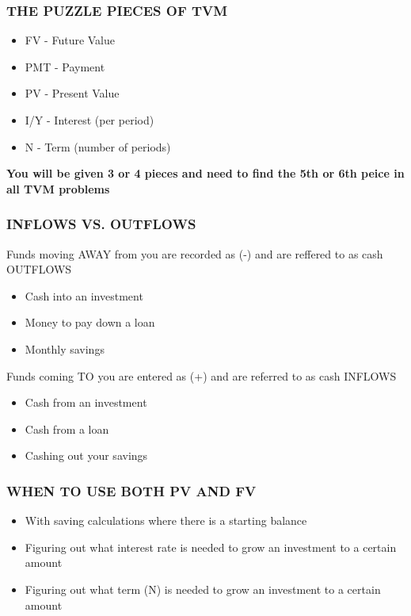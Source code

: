 \documentclass[12pt]{article}
\begin{document}
            \subsubsection{THE PUZZLE PIECES OF TVM}
                \begin{itemize}
                    \item FV - Future Value
                    \item PMT - Payment
                    \item PV - Present Value
                    \item I/Y - Interest (per period)
                    \item N - Term (number of periods)
                \end{itemize}
                \textbf{You will be given 3 or 4 pieces and need to find the 5th or 6th peice in all TVM problems}
            \subsubsection{INFLOWS VS. OUTFLOWS}
                Funds moving AWAY from you are recorded as (-) and are reffered to as cash OUTFLOWS
                \begin{itemize}
                    \item Cash into an investment
                    \item Money to pay down a loan
                    \item Monthly savings
                \end{itemize}
                Funds coming TO you are entered as (+) and are referred to as cash INFLOWS
                \begin{itemize}
                    \item Cash from an investment
                    \item Cash from a loan
                    \item Cashing out your savings
                \end{itemize}
            \subsubsection{WHEN TO USE BOTH PV AND FV}
                \begin{itemize}
                    \item With saving calculations where there is a starting balance
                    \item Figuring out what interest rate is needed to grow an investment to a certain amount
                    \item Figuring out what term (N) is needed to grow an investment to a certain amount
                \end{itemize}
\end{document}
